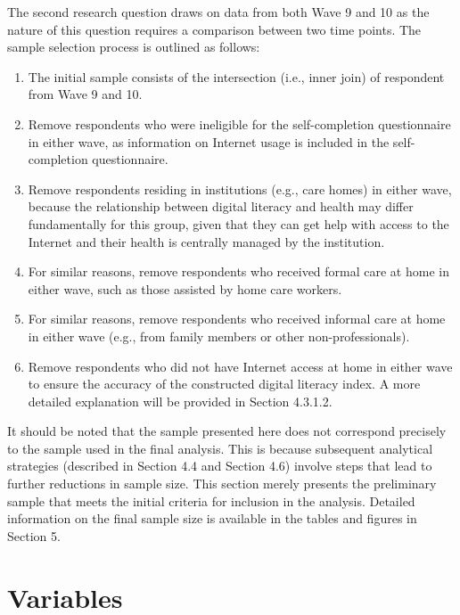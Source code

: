 The second research question draws on data from both Wave 9 and 10 as the nature of this question requires a comparison between two time points. The sample selection process is outlined as follows:

\begin{enumerate}
    \item The initial sample consists of the intersection (i.e., inner join) of respondent from Wave 9 and 10.
    \item Remove respondents who were ineligible for the self-completion questionnaire in either wave, as information on Internet usage is included in the self-completion questionnaire.
    \item Remove respondents residing in institutions (e.g., care homes) in either wave, because the relationship between digital literacy and health may differ fundamentally for this group, given that they can get help with access to the Internet and their health is centrally managed by the institution.
    \item For similar reasons, remove respondents who received formal care at home in either wave, such as those assisted by home care workers.
    \item For similar reasons, remove respondents who received informal care at home in either wave (e.g., from family members or other non-professionals).
    \item Remove respondents who did not have Internet access at home in either wave to ensure the accuracy of the constructed digital literacy index. A more detailed explanation will be provided in Section 4.3.1.2.
\end{enumerate}

It should be noted that the sample presented here does not correspond precisely to the sample used in the final analysis. This is because subsequent analytical strategies (described in Section 4.4 and Section 4.6) involve steps that lead to further reductions in sample size. This section merely presents the preliminary sample that meets the initial criteria for inclusion in the analysis. Detailed information on the final sample size is available in the tables and figures in Section 5.

\section{Variables}

